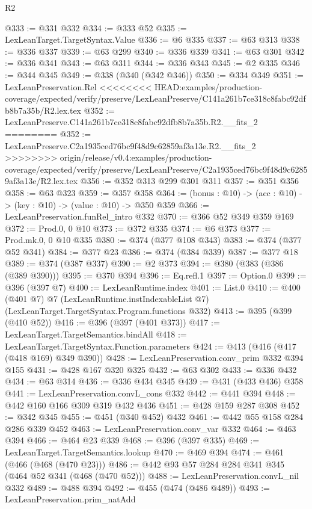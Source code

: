 \begin{lexlean}{R2}
\begin{coremodule}
{{{{{{{{{{{{{{{{{{{{{{@333 := @331 @332
@334 := @333 @52
@335 := LexLeanTarget.TargetSyntax.Value
@336 := @6 @335
@337 := @63 @313
@338 := @336 @337
@339 := @63 @299
@340 := @336 @339
@341 := @63 @301
@342 := @336 @341
@343 := @63 @311
@344 := @336 @343
@345 := @2 @335
@346 := @344 @345
@349 := @338 (@340 (@342 @346))
@350 := @334 @349
@351 := LexLeanPreservation.Rel
<<<<<<<< HEAD:examples/production-coverage/expected/verify/preserve/LexLeanPreserve/C141a261b7ce318c8fabc92dfb8b7a35b/R2.lex.tex
@352 := LexLeanPreserve.C141a261b7ce318c8fabc92dfb8b7a35b.R2.__fits_2
========
@352 := LexLeanPreserve.C2a1935ced76bc9f48d9c62859af3a13e.R2.__fits_2
>>>>>>>> origin/release/v0.4:examples/production-coverage/expected/verify/preserve/LexLeanPreserve/C2a1935ced76bc9f48d9c62859af3a13e/R2.lex.tex
@356 := @352 @313 @299 @301 @311
@357 := @351 @356
@358 := @63 @323
@359 := @357 @358
@364 := (bonus : @10) -> (acc : @10) -> (key : @10) -> (value : @10) -> @350 @359
@366 := LexLeanPreservation.funRel_intro @332
@370 := @366 @52 @349 @359 @169
@372 := Prod.{0, 0} @10
@373 := @372 @335
@374 := @6 @373
@377 := Prod.mk.{0, 0} @10 @335
@380 := @374 (@377 @108 @343)
@383 := @374 (@377 @52 @341)
@384 := @377 @23
@386 := @374 (@384 @339)
@387 := @377 @18
@389 := @374 (@387 @337)
@390 := @2 @373
@394 := @380 (@383 (@386 (@389 @390)))
@395 := @370 @394
@396 := Eq.refl.{1}
@397 := Option.{0}
@399 := @396 (@397 @7)
@400 := LexLeanRuntime.index
@401 := List.{0}
@410 := @400
    (@401 @7)
    @7
    (LexLeanRuntime.instIndexableList @7)
    (LexLeanTarget.TargetSyntax.Program.functions @332)
@413 := @395 (@399 (@410 @52))
@416 := @396 (@397 (@401 @373))
@417 := LexLeanTarget.TargetSemantics.bindAll
@418 := LexLeanTarget.TargetSyntax.Function.parameters
@424 := @413 (@416 (@417 (@418 @169) @349 @390))
@428 := LexLeanPreservation.conv_prim @332 @394 @155
@431 := @428 @167 @320 @325
@432 := @63 @302
@433 := @336 @432
@434 := @63 @314
@436 := @336 @434 @345
@439 := @431 (@433 @436) @358
@441 := LexLeanPreservation.convL_cons @332
@442 := @441 @394
@448 := @442 @160 @166 @309 @319 @432 @436
@451 := @428 @159 @287 @308
@452 := @342 @345
@455 := @451 (@340 @452) @432
@461 := @442 @55 @158 @284 @286 @339 @452
@463 := LexLeanPreservation.conv_var @332
@464 := @463 @394
@466 := @464 @23 @339
@468 := @396 (@397 @335)
@469 := LexLeanTarget.TargetSemantics.lookup
@470 := @469 @394
@474 := @461 (@466 (@468 (@470 @23)))
@486 := @442 @93 @57 @284 @284 @341 @345 (@464 @52 @341 (@468 (@470 @52)))
@488 := LexLeanPreservation.convL_nil @332
@489 := @488 @394
@492 := @455 (@474 (@486 @489))
@493 := LexLeanPreservation.prim_natAdd
}}}}}}}}}}}}}}}}}}}}}}
\end{coremodule}
\end{lexlean}
